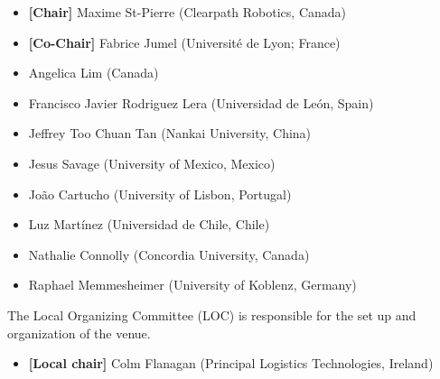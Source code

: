 \begin{itemize}
	\item \textbf{[Chair]} Maxime St-Pierre (Clearpath Robotics, Canada)
	\item \textbf{[Co-Chair]} Fabrice Jumel (Université de Lyon; France)
	\item Angelica Lim (Canada)
	\item Francisco Javier Rodriguez Lera (Universidad de León, Spain)
	\item Jeffrey Too Chuan Tan (Nankai University, China)
	\item Jesus Savage (University of Mexico, Mexico)
	\item João Cartucho (University of Lisbon, Portugal)
	\item Luz Martínez (Universidad de Chile, Chile)
	\item Nathalie Connolly (Concordia University, Canada)
	\item Raphael Memmesheimer (University of Koblenz, Germany)
\end{itemize}

The Local Organizing Committee (LOC) is responsible for the set up and organization of the venue.
\begin{itemize}
	\item \textbf{[Local chair]} Colm Flanagan (Principal Logistics Technologies, Ireland)
\end{itemize}
